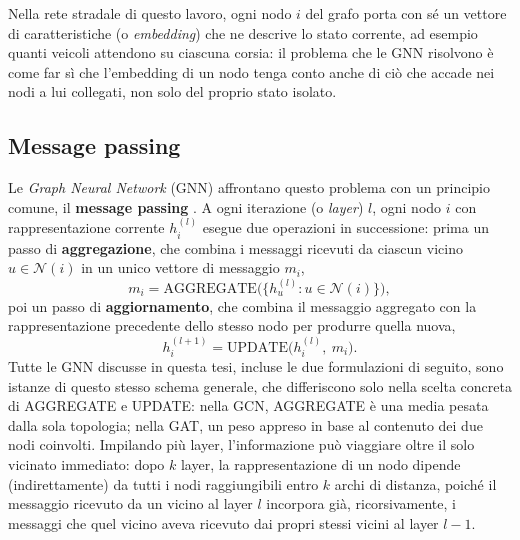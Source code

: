 Nella rete stradale di questo lavoro, ogni nodo $i$ del grafo porta con sé
un vettore di caratteristiche (o \emph{embedding}) che ne descrive lo
stato corrente, ad esempio quanti veicoli attendono su ciascuna corsia:
il problema che le GNN risolvono è come far sì che l'embedding di un nodo
tenga conto anche di ciò che accade nei nodi a lui collegati, non solo del
proprio stato isolato.

\subsection{Message passing}

Le \emph{Graph Neural Network} (GNN) affrontano questo problema con un
principio comune, il \textbf{message passing} \citep{wu2021gnnsurvey,
bacciu2020gentlegnn}. A ogni iterazione (o \emph{layer}) $l$, ogni nodo
$i$ con rappresentazione corrente $h_i^{(l)}$ esegue due operazioni in
successione: prima un passo di \textbf{aggregazione}, che combina i
messaggi ricevuti da ciascun vicino $u \in \mathcal{N}(i)$ in un unico
vettore di messaggio $m_i$,
\[m_i = \mathrm{AGGREGATE}\big(\{h_u^{(l)} : u \in \mathcal{N}(i)\}\big),\]
poi un passo di \textbf{aggiornamento}, che combina il messaggio
aggregato con la rappresentazione precedente dello stesso nodo per
produrre quella nuova,
\[h_i^{(l+1)} = \mathrm{UPDATE}\big(h_i^{(l)},\ m_i\big).\]
Tutte le GNN discusse in questa tesi, incluse le due formulazioni di
seguito, sono istanze di questo stesso schema generale, che differiscono
solo nella scelta concreta di AGGREGATE e UPDATE: nella GCN, AGGREGATE è
una media pesata dalla sola topologia; nella GAT, un peso appreso in base
al contenuto dei due nodi coinvolti. Impilando più layer, l'informazione
può viaggiare oltre il solo vicinato immediato: dopo $k$ layer, la
rappresentazione di un nodo dipende (indirettamente) da tutti i nodi
raggiungibili entro $k$ archi di distanza, poiché il messaggio ricevuto da
un vicino al layer $l$ incorpora già, ricorsivamente, i messaggi che
quel vicino aveva ricevuto dai propri stessi vicini al layer $l-1$.

